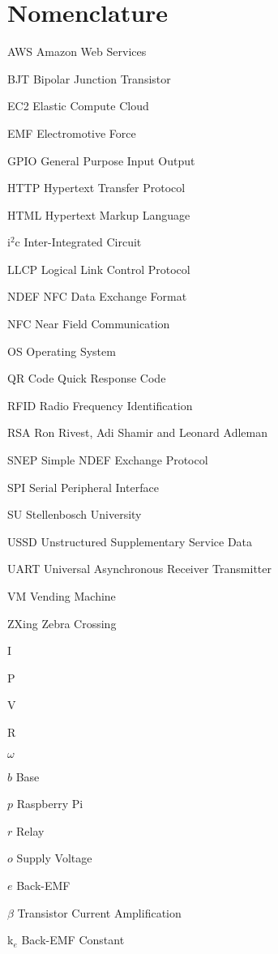 \chapter{Nomenclature}

\begin{Nomencl}
   \item[AWS]\dotfill Amazon Web Services
   \item[BJT]\dotfill Bipolar Junction Transistor
   \item[EC2]\dotfill Elastic Compute Cloud
   \item[EMF]\dotfill Electromotive Force
   \item[GPIO]\dotfill General Purpose Input Output
   \item[HTTP]\dotfill Hypertext Transfer Protocol
   \item[HTML]\dotfill Hypertext Markup Language
   \item[i$^2$c]\dotfill Inter-Integrated Circuit
   \item[LLCP]\dotfill Logical Link Control Protocol
   \item[NDEF]\dotfill NFC Data Exchange Format
   \item[NFC]\dotfill Near Field Communication
   \item[OS]\dotfill Operating System
   \item[QR Code]\dotfill Quick Response Code
   \item[RFID]\dotfill Radio Frequency Identification
   \item[RSA]\dotfill Ron Rivest, Adi Shamir and Leonard Adleman
   \item[SNEP]\dotfill Simple NDEF Exchange Protocol
   \item[SPI]\dotfill Serial Peripheral Interface
   \item[SU]\dotfill Stellenbosch University
   \item[USSD]\dotfill Unstructured Supplementary Service Data
   \item[UART]\dotfill Universal Asynchronous Receiver Transmitter
   \item[VM]\dotfill Vending Machine
   \item[ZXing]\dotfill Zebra Crossing
   \item[I]
   \item[P]
   \item[V]
   \item[R]
   \item[$\omega$]
   \item[$b$]\dotfill Base
   \item[$p$]\dotfill Raspberry Pi
   \item[$r$]\dotfill Relay				%
   \item[$o$]\dotfill Supply Voltage
   \item[$e$]\dotfill Back-EMF
   \item[$\beta$]\dotfill Transistor Current Amplification  
   \item[k$_e$]\dotfill Back-EMF Constant
\end{Nomencl}

\endinput
